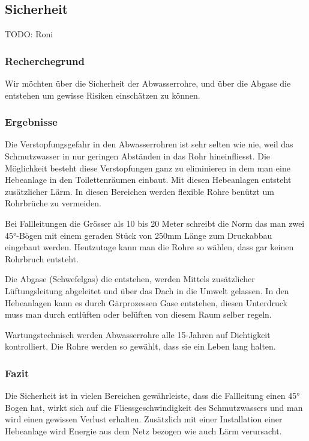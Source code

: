 \subsection{Sicherheit}

TODO: Roni

\subsubsection{Recherchegrund}
Wir möchten über die Sicherheit der Abwasserrohre, und über die Abgase die entstehen um gewisse Risiken einschätzen zu können. 

\subsubsection{Ergebnisse}

Die Verstopfungsgefahr in den Abwasserrohren ist sehr selten wie nie, weil das Schmutzwasser in nur geringen Abständen in das Rohr hineinfliesst. Die Möglichkeit besteht diese Verstopfungen ganz zu eliminieren in dem man eine Hebeanlage in den Toilettenräumen einbaut. Mit diesen Hebeanlagen entsteht zusätzlicher Lärm. In diesen Bereichen werden flexible Rohre benützt um Rohrbrüche zu vermeiden.

Bei Fallleitungen die Grösser als 10 bis 20 Meter schreibt die Norm das man zwei 45°-Bögen mit einem geraden Stück von 250mm Länge zum Druckabbau eingebaut werden. Heutzutage kann man die Rohre so wählen, dass gar keinen Rohrbruch entsteht.

Die Abgase (Schwefelgas) die entstehen, werden Mittels zusätzlicher Lüftungsleitung abgeleitet und über das Dach in die Umwelt gelassen. In den Hebeanlagen kann es durch Gärprozessen Gase entstehen, diesen Unterdruck muss man durch entlüften oder belüften von diesem Raum selber regeln. 

Wartungstechnisch werden Abwasserrohre alle 15-Jahren auf Dichtigkeit kontrolliert. Die Rohre werden so gewählt, dass sie ein Leben lang halten.

\subsubsection{Fazit}
Die Sicherheit ist in vielen Bereichen gewährleiste, dass die Fallleitung einen 45° Bogen hat, wirkt sich auf die Fliessgeschwindigkeit des Schmutzwassers und man wird einen gewissen Verlust erhalten. Zusätzlich mit einer Installation einer Hebeanlage wird Energie aus dem Netz bezogen wie auch Lärm verursacht.

\clearpage 





